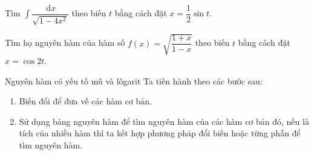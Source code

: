 \begin{bt}%
	Tìm $\displaystyle\int\limits \dfrac{\mathrm{\, d}x}{\sqrt{1-4x^2}}$ theo biến $ t $ bằng cách đặt $x=\dfrac{1}{2}\sin t$.
\end{bt}

\begin{bt}%
	Tìm họ nguyên hàm của hàm số $f(x)=\sqrt{\dfrac{1+x}{1-x}}$ theo biến $ t $ bằng cách đặt $x=\cos 2t$.
\end{bt}
\begin{dang}{Nguyên hàm có yếu tố mũ và lôgarit}
Ta tiến hành theo các bước sau:
\begin{enumerate}[\bf Bước 1.]
\item Biến đổi để đưa về các hàm cơ bản.
\item Sử dụng bảng nguyên hàm để tìm nguyên hàm của các hàm cơ bản đó, nếu là tích của nhiều hàm thì ta kết hợp phương pháp đổi biến hoặc từng phần để tìm nguyên hàm.
\end{enumerate}
\end{dang}

